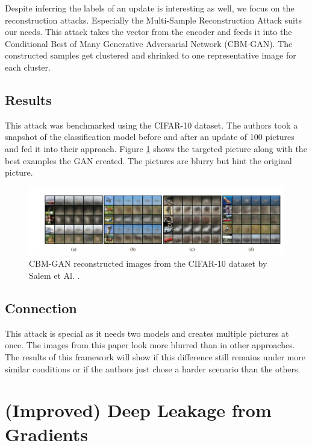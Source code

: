 \documentclass[
	ngerman,
	ruledheaders=section,%
	class=report,%
	thesis={type=bachelor},%
	accentcolor=1b,%
	custommargins=true,%
	marginpar=false,%
	parskip=half-,%
	fontsize=11pt,%
]{tudapub}
\begin{document}
Despite inferring the labels of an update is interesting as well, we focus on the reconstruction attacks. Especially the Multi-Sample Reconstruction Attack suits our needs. This attack takes the vector from the encoder and feeds it into the Conditional Best of Many Generative Adversarial Network (CBM-GAN). The constructed samples get clustered and shrinked to one representative image for each cluster. 

\subsection{Results}
This attack was benchmarked using the CIFAR-10 dataset. The authors took a snapshot of the classification model before and after an update of 100 pictures and fed it into their approach. Figure \ref{fig:cbm_gan} shows the targeted picture along with the best examples the GAN created. The pictures are blurry but hint the original picture.

\begin{figure}[H] 
  \centering
    \includegraphics[width=1\textwidth]{Figures/cbm_gan.PNG}
  \caption{ CBM-GAN reconstructed images from the CIFAR-10 dataset by Salem et Al. \cite{salem2019updates}.}
  \label{fig:cbm_gan}
\end{figure}


\subsection{Connection}
This attack is special as it needs two models and creates multiple pictures at once. The images from this paper look more blurred than in other approaches. The results of this framework will show if this difference still remains under more similar conditions or if the authors just chose a harder scenario than the others.







\section{(Improved) Deep Leakage from Gradients}
\end{document}
